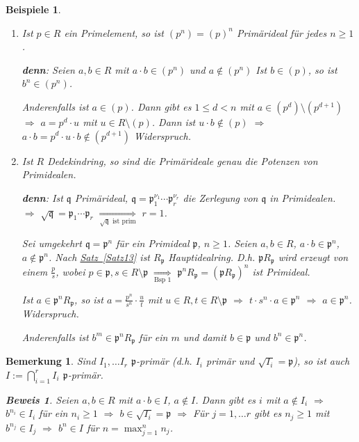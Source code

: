 \documentclass[a4paper,12pt]{scrbook}
\theoremstyle{break}
\newtheorem{Bem}[Def]{Bemerkung}
\theoremstyle{nonumberbreak}
\newtheorem{Bew}{Beweis}
\newtheorem{nnBsp}{Beispiele}
\theoremstyle{nonumberplain}
\newcommand{\myref}[2]{%
\hyperref[#2]{#1~\ref*{#2}}%
}
\begin{document}
\begin{nnBsp}
\begin{enumerate}
\item[1)] Ist $p \in R$ ein Primelement, so ist $(p^n) = (p)^n$ Primärideal für jedes $n \geq 1$.

\textbf{denn}: Seien $a, b \in R$ mit $a \cdot b \in (p^n)$ und $a \notin (p^n)$ Ist $b \in (p)$, so ist $b^n \in (p^n)$.

Anderenfalls ist $a \in (p)$. Dann gibt es $1 \leq d < n$ mit $a \in (p^d) \setminus (p^{d+1})$ $\Rightarrow$ $a = p^d \cdot u$ mit $u \in R \setminus (p)$. Dann ist $u \cdot b \notin (p)$ $\Rightarrow$ $a \cdot b = p^d \cdot u \cdot b \notin (p^{d+1})$ Widerspruch.

\item[2)] Ist $R$ Dedekindring, so sind die Primärideale genau die Potenzen von Primidealen.

\textbf{denn}: Ist $\mathfrak{q}$ Primärideal, $\mathfrak{q} = \mathfrak{p}_1^{\nu_1} \cdots \mathfrak{p}_r^{\nu_r}$ die Zerlegung von $\mathfrak{q}$ in Primidealen.\\
$\Rightarrow$ $\sqrt{\mathfrak{q}} = \mathfrak{p}_1 \cdots \mathfrak{p}_r$ $\underset{\sqrt{\mathfrak{q}}\text{ ist prim}}\Rightarrow$ $r=1$.

Sei umgekehrt $\mathfrak{q} = \mathfrak{p}^n$ für ein Primideal $\mathfrak{p}$, $n \geq 1$. Seien $a, b \in R$, $a \cdot b \in \mathfrak{p}^n$, $a \notin \mathfrak{p}^n$. Nach \myref{Satz}{Satz13} ist $R_\mathfrak{p}$ Hauptidealring. D.h. $\mathfrak{p} R_\mathfrak{p}$ wird erzeugt von einem $\frac{p}{s}$, wobei $p \in \mathfrak{p}, s \in R \setminus \mathfrak{p}$ $\underset{\text{Bsp 1}}\Rightarrow$ $\mathfrak{p}^n R_\mathfrak{p} = (\mathfrak{p} R_\mathfrak{p})^n$ ist Primideal.

Ist $a \in \mathfrak{p}^n R_\mathfrak{p}$, so ist $a = \frac{p^n}{s^n} \cdot \frac{u}{t}$ mit $u \in R, t \in R \setminus \mathfrak{p}$ $\Rightarrow$ $t \cdot s^n \cdot a \in \mathfrak{p}^n$ $\Rightarrow$ $a \in \mathfrak{p}^n$. Widerspruch.

Anderenfalls ist $b^m \in \mathfrak{p}^n R_\mathfrak{p}$ für ein $m$ und damit $b \in \mathfrak{p}$ und $b^n \in \mathfrak{p}^n$.

\end{enumerate}
\end{nnBsp}

\begin{Bem}
Sind $I_1, \ldots I_r$ $\mathfrak{p}$-primär (d.h. $I_i$ primär und $\sqrt{I_i} = \mathfrak{p}$), so ist auch $I := \displaystyle\bigcap_{i=1}^{r} I_i$ $\mathfrak{p}$-primär.

\begin{Bew}
Seien $a,b \in R$ mit $a \cdot b \in I$, $a \notin I$. Dann gibt es $i$ mit $a \notin I_i$ $\Rightarrow$ $b^{n_i} \in I_i$ für ein $n_i \geq 1$ $\Rightarrow$ $b \in \sqrt{I_i} = \mathfrak{p}$ $\Rightarrow$ Für $j = 1, \ldots r$ gibt es $n_j \geq 1$ mit $b^{n_j} \in I_j$ $\Rightarrow$ $b^n \in I$ für $n = \max_{j=1}^{n} n_j$.

\end{Bew}
\end{Bem}
\end{document}
